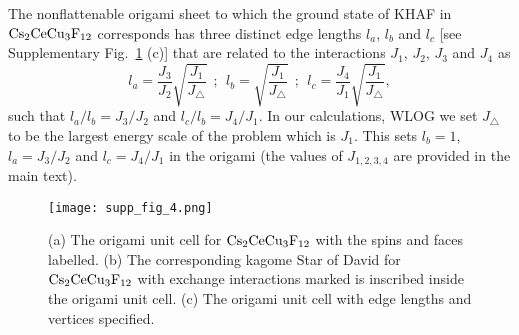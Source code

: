 \documentclass[a4paper,aps,prl,floatfix,showpacs,superscriptaddress,notitlepage]{revtex4-1}
\begin{document}
The nonflattenable origami sheet to which the ground state of KHAF in ${\rm Cs}_2{\rm CeCu}_3{\rm F}_{12}$ corresponds has three distinct edge lengths $l_a$, $l_b$ and $l_c$ [see Supplementary Fig.~\ref{fig_latt2} (c)] that are related to the interactions $J_1$, $J_2$, $J_3$ and $J_4$ as
\begin{equation}
 l_a=\frac{J_3}{J_2}\sqrt{\frac{J_1}{J_\triangle}}~~;~~l_b=\sqrt{\frac{J_1}{J_\triangle}}~~;~~l_c=\frac{J_4}{J_1}\sqrt{\frac{J_1}{J_\triangle}}, 
\end{equation}
such that $l_a/l_b=J_3/J_2$ and $l_c/l_b=J_4/J_1$. In our calculations, WLOG we set $J_\triangle$ to be the largest energy scale of the problem which is $J_1$. This sets $l_b=1$, $l_a=J_3/J_2$ and $l_c=J_4/J_1$ in the origami (the values of $J_{1,2,3,4}$ are provided in the main text).

\begin{figure}
\centering
 \texttt{[image: supp\_fig\_4.png]}
 \caption{(a) The origami unit cell for ${\rm Cs}_2{\rm CeCu}_3{\rm F}_{12}$ with the spins and faces labelled. (b) The corresponding kagome Star of David for ${\rm Cs}_2{\rm CeCu}_3{\rm F}_{12}$ with exchange interactions marked is inscribed inside the origami unit cell. (c) The origami unit cell with edge lengths and vertices specified.}
\label{fig_latt2}
\end{figure}
\end{document}

